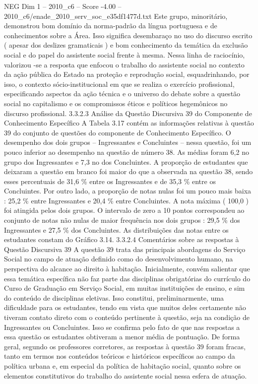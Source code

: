 \begin{textsample}{NEG Dim 1 – 2010\_c6 – Score -4.00 – 2010\_c6/enade\_2010\_serv\_soc\_e35df1477d.txt}
Este grupo, minoritário, demonstrou bom domínio da norma-padrão da língua portuguesa e de conhecimentos sobre a Área.
Isso significa desembaraço no uso do discurso escrito ( apesar dos deslizes gramaticais ) e bom conhecimento da temática da exclusão social e do papel do assistente social frente à mesma.
Nessa linha de raciocínio, valorizou -se a resposta que enfocou o trabalho do assistente social no contexto da ação pública do Estado na proteção e reprodução social, esquadrinhando, por isso, o contexto sócio-institucional em que se realiza o exercício profissional, especificando aspectos da ação técnica e o universo do debate sobre a questão social no capitalismo e os compromissos éticos e políticos hegemônicos no discurso profissional. 3.3.2.3 Análise da Questão Discursiva 39 do Componente de Conhecimento Específico A Tabela 3.17 contém as informações relativas à questão 39 do conjunto de questões do componente de Conhecimento Específico.
O desempenho dos dois grupos – Ingressantes e Concluintes – nessa questão, foi um pouco inferior ao desempenho na questão de número 38.
As médias foram 6,2 no grupo dos Ingressantes e 7,3 no dos Concluintes.
A proporção de estudantes que deixaram a questão em branco foi maior do que a observada na questão 38, sendo esses percentuais de 31,6 \% entre os Ingressantes e de 35,3 \% entre os Concluintes.
Por outro lado, a proporção de notas nulas foi um pouco mais baixa : 25,2 \% entre Ingressantes e 20,4 \% entre Concluintes.
A nota máxima ( 100,0 ) foi atingida pelos dois grupos.
O intervalo de zero a 10 pontos correspondeu ao conjunto de notas não nulas de maior frequência nos dois grupos : 29,5 \% dos Ingressantes e 27,5 \% dos Concluintes.
As distribuições das notas entre os estudantes constam do Gráfico 3.14. 3.3.2.4 Comentários sobre as respostas à Questão Discursiva 39 A questão 39 trata das principais abordagens do Serviço Social no campo de atuação definido como do desenvolvimento humano, na perspectiva do alcance ao direito à habitação.
Inicialmente, convém salientar que essa temática específica não faz parte das disciplinas obrigatórias do currículo do Curso de Graduação em Serviço Social, em muitas instituições de ensino, e sim do conteúdo de disciplinas eletivas.
Isso constitui, preliminarmente, uma dificuldade para os estudantes, tendo em vista que muitos deles certamente não tiveram contato direto com o conteúdo pertinente à questão, seja na condição de Ingressantes ou Concluintes.
Isso se confirma pelo fato de que nas respostas a essa questão os estudantes obtiveram a menor média de pontuação.
De forma geral, segundo os professores corretores, as respostas à questão 39 foram fracas, tanto em termos nos conteúdos teóricos e históricos específicos ao campo da política urbana e, em especial da política de habitação social, quanto sobre os elementos constitutivos do trabalho do assistente social nessa esfera de atuação.

\end{textsample}
